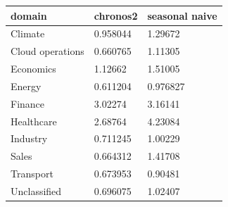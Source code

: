\begin{tabular}{lll}
\toprule
domain & chronos2 & seasonal naive \\
\midrule
Climate & 0.958044 & 1.29672 \\
Cloud operations & 0.660765 & 1.11305 \\
Economics & 1.12662 & 1.51005 \\
Energy & 0.611204 & 0.976827 \\
Finance & 3.02274 & 3.16141 \\
Healthcare & 2.68764 & 4.23084 \\
Industry & 0.711245 & 1.00229 \\
Sales & 0.664312 & 1.41708 \\
Transport & 0.673953 & 0.90481 \\
Unclassified & 0.696075 & 1.02407 \\
\bottomrule
\end{tabular}
